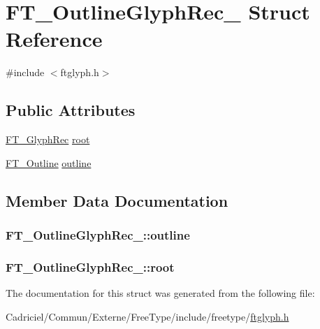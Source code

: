 \hypertarget{struct_f_t___outline_glyph_rec__}{\section{F\-T\-\_\-\-Outline\-Glyph\-Rec\-\_\- Struct Reference}
\label{struct_f_t___outline_glyph_rec__}
}


{\ttfamily \#include $<$ftglyph.\-h$>$}

\subsection*{Public Attributes}
\begin{DoxyCompactItemize}
\item 
\hyperlink{ftglyph_8h_a095b515f46c978b33ffc9c20aad081a4}{F\-T\-\_\-\-Glyph\-Rec} \hyperlink{struct_f_t___outline_glyph_rec___a71e5a8d5fe69e0cea68c96486dd6713f}{root}
\item 
\hyperlink{ftimage_8h_a79cb182373b5aa3041955b19ce32afca}{F\-T\-\_\-\-Outline} \hyperlink{struct_f_t___outline_glyph_rec___af1bd473a32fcbc500edcfcf89e3ac8ac}{outline}
\end{DoxyCompactItemize}


\subsection{Member Data Documentation}
\hypertarget{struct_f_t___outline_glyph_rec___af1bd473a32fcbc500edcfcf89e3ac8ac}{
\subsubsection[{outline}]{ F\-T\-\_\-\-Outline\-Glyph\-Rec\-\_\-\-::outline}}\label{struct_f_t___outline_glyph_rec___af1bd473a32fcbc500edcfcf89e3ac8ac}
\hypertarget{struct_f_t___outline_glyph_rec___a71e5a8d5fe69e0cea68c96486dd6713f}{
\subsubsection[{root}]{ F\-T\-\_\-\-Outline\-Glyph\-Rec\-\_\-\-::root}}\label{struct_f_t___outline_glyph_rec___a71e5a8d5fe69e0cea68c96486dd6713f}


The documentation for this struct was generated from the following file\-:\begin{DoxyCompactItemize}
\item 
Cadriciel/\-Commun/\-Externe/\-Free\-Type/include/freetype/\hyperlink{ftglyph_8h}{ftglyph.\-h}\end{DoxyCompactItemize}
